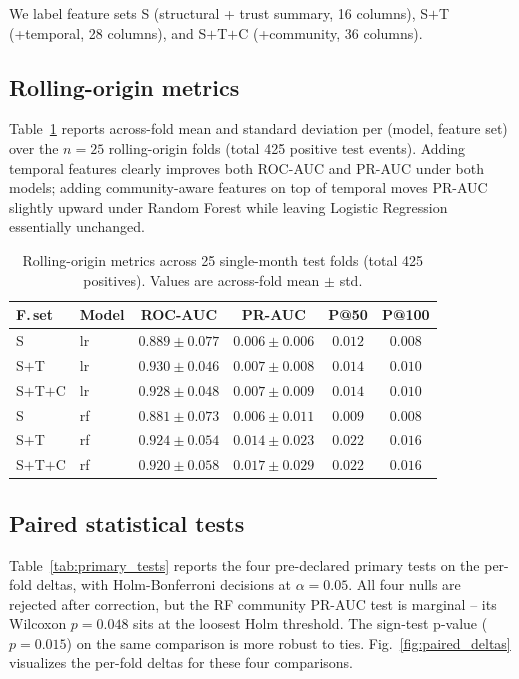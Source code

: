 \documentclass[conference]{IEEEtran}
\begin{document}
We label feature sets S (structural + trust summary, 16 columns),
S$+$T (+temporal, 28 columns), and S$+$T$+$C (+community, 36 columns).

\subsection{Rolling-origin metrics}\label{sec:results:rolling}

Table~\ref{tab:rolling_summary} reports across-fold mean and standard
deviation per (model, feature set) over the $n = 25$ rolling-origin
folds (total 425 positive test events). Adding temporal features
clearly improves both ROC-AUC and PR-AUC under both models; adding
community-aware features on top of temporal moves PR-AUC slightly
upward under Random Forest while leaving Logistic Regression
essentially unchanged.

\begin{table}[t]
\caption{Rolling-origin metrics across 25 single-month test folds
(total 425 positives). Values are across-fold mean $\pm$ std.}
\label{tab:rolling_summary}
\centering
\small
\begin{tabular}{llcccc}
\toprule
F.\,set & Model & ROC-AUC & PR-AUC & P@50 & P@100 \\
\midrule
S       & lr & $0.889 \pm 0.077$ & $0.006 \pm 0.006$ & $0.012$ & $0.008$ \\
S$+$T   & lr & $0.930 \pm 0.046$ & $0.007 \pm 0.008$ & $0.014$ & $0.010$ \\
S$+$T$+$C & lr & $0.928 \pm 0.048$ & $0.007 \pm 0.009$ & $0.014$ & $0.010$ \\
\addlinespace
S       & rf & $0.881 \pm 0.073$ & $0.006 \pm 0.011$ & $0.009$ & $0.008$ \\
S$+$T   & rf & $0.924 \pm 0.054$ & $0.014 \pm 0.023$ & $0.022$ & $0.016$ \\
S$+$T$+$C & rf & $0.920 \pm 0.058$ & $0.017 \pm 0.029$ & $0.022$ & $0.016$ \\
\bottomrule
\end{tabular}
\end{table}

\subsection{Paired statistical tests}\label{sec:results:tests}

Table~\ref{tab:primary_tests} reports the four pre-declared primary
tests on the per-fold deltas, with Holm-Bonferroni decisions at
$\alpha = 0.05$. All four nulls are rejected after correction, but
the RF community PR-AUC test is marginal -- its Wilcoxon $p = 0.048$
sits at the loosest Holm threshold. The sign-test p-value
($p = 0.015$) on the same comparison is more robust to ties.
Fig.~\ref{fig:paired_deltas} visualizes the per-fold deltas for
these four comparisons.
\end{document}

